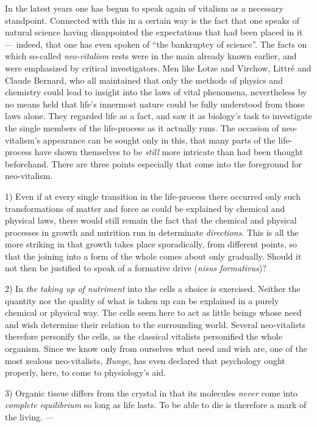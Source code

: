 \documentclass[12pt,a4paper]{article}
\begin{document}
In the latest years one has begun to speak again of vitalism as a necessary
standpoint. Connected with this in a certain way is the fact that one speaks of
natural science having
disappointed the expectations that had been placed in it --- indeed, that one
has even spoken of ``the bankruptcy of science''. The facts on which so-called
\emph{neo-vitalism} rests were in the main already known earlier, and were
emphasized by critical investigators. Men like Lotze and Virchow, Littré and
Claude Bernard, who all maintained that only the methods of physics and
chemistry could lead to insight into the laws of vital phenomena, nevertheless
by no means held that life's innermost nature could be fully understood from
those laws alone. They regarded life as a fact, and saw it as biology's task to
investigate the single members of the life-process as it actually runs. The
occasion of neo-vitalism's appearance can be sought only in this, that many
parts of the life-process have shown themselves to be \emph{still} more
intricate than had been thought beforehand. There are three points especially
that come into the foreground for neo-vitalism.

1) Even if at every single transition in the life-process there occurred only
such transformations of matter and force as could be explained by chemical and
physical laws, there would still remain the fact that the chemical and physical
processes in growth and nutrition run in determinate \emph{directions}. This is
all the more striking in that growth takes place sporadically, from different
points, so that the joining into a form of the whole comes about only gradually.
Should it not then be justified to speak of a formative drive (\textit{nisus
formativus})?

2) In \emph{the taking up of nutriment} into the cells a choice is exercised.
Neither the quantity nor the quality of what is taken up can be explained in a
purely chemical or physical way. The cells seem here to act as little beings
whose need and wish determine their relation to the surrounding world. Several
neo-vitalists therefore personify the cells, as the classical vitalists
personified the whole organism. Since we know only from ourselves what need and
wish are, one of the most zealous neo-vitalists, \emph{Bunge}, has even declared
that psychology ought properly, here, to come to physiology's aid.

3) Organic tissue differs from the crystal in that its molecules \emph{never}
come into \emph{complete equilibrium}
so long as life lasts. To be able to die is therefore a mark of the living. ---
\end{document}
